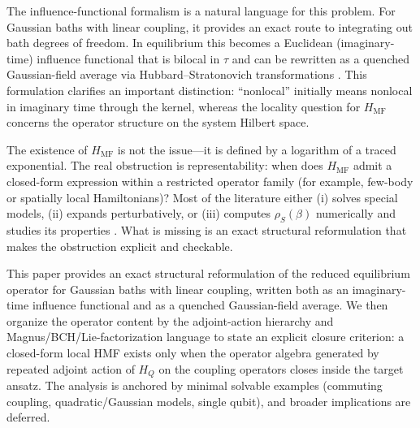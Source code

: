 The influence-functional formalism is a natural language for this problem.
For Gaussian baths with linear coupling, it provides an exact route to
integrating out bath degrees of freedom\cite{feynmanTheoryGeneralQuantum1963a,caldeiraQuantumTunnellingDissipative1983a,grabertQuantumBrownianMotion1988}.
In equilibrium this becomes a Euclidean (imaginary-time) influence functional
that is bilocal in $\tau$ and can be rewritten as a quenched Gaussian-field
average via Hubbard--Stratonovich transformations
\cite{hubbardCalculationPartitionFunctions1959a,stratonovich1957QDistro,stockburgerExactNumberRepresentation2002,moixEquilibriumreducedDensityMatrix2012,chenRigorousStochasticMatrix2014}.
This formulation clarifies an important distinction: ``nonlocal'' initially
means nonlocal in imaginary time through the kernel, whereas the locality
question for $H_{\mathrm{MF}}$ concerns the operator structure on the system
Hilbert space.

The existence of $H_{\mathrm{MF}}$ is not the issue---it is defined by a
logarithm of a traced exponential. The real obstruction is representability:
when does $H_{\mathrm{MF}}$ admit a closed-form expression within a restricted
operator family (for example, few-body or spatially local Hamiltonians)? Most of
the literature either (i) solves special models, (ii) expands perturbatively, or
(iii) computes $\rho_S(\beta)$ numerically and studies its properties
\cite{burkeStructureHamiltonianMean2024,duGeneralizedHamiltonianMeanforce2025a,cresserWeakUltrastrongCoupling2021a}.
What is missing is an exact structural reformulation that makes the obstruction
explicit and checkable.

This paper provides an exact structural reformulation of the reduced equilibrium
operator for Gaussian baths with linear coupling, written both as an
imaginary-time influence functional and as a quenched Gaussian-field average.
We then organize the operator content by the adjoint-action hierarchy and
Magnus/BCH/Lie-factorization language to state an explicit closure criterion: a
closed-form local HMF exists only when the operator algebra generated by
repeated adjoint action of $H_Q$ on the coupling operators closes inside the
target ansatz. The analysis is anchored by minimal solvable examples (commuting
coupling, quadratic/Gaussian models, single qubit), and broader implications are
deferred.


